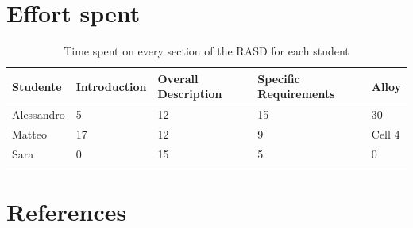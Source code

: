 \documentclass[12pt,a4paper]{article}
\begin{document}
\section{Effort spent}
\begin{table}[h]
  \centering
  \begin{tabular}{|p{1.5cm}|p{1.5cm}|p{1.5cm}|p{1.5cm}|p{1.5cm}|}
    \hline
     Studente & Introduction & Overall Description & Specific Requirements & Alloy \\
    \hline
    Alessandro & 5 & 12 & 15 & 30 \\
    \hline
    Matteo & 17 & 12 & 9 & Cell 4 \\
    \hline
    Sara & 0 & 15 & 5 & 0 \\
    \hline
  \end{tabular}
  \caption{Time spent on every section of the RASD for each student}
  \label{tab:effort}
\end{table}

\section{References}
%
%
\end{document}

